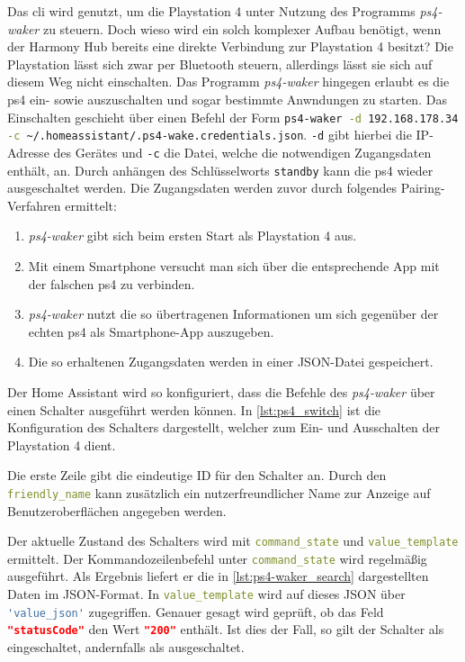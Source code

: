 Das \ac{cli} wird genutzt, um die Playstation 4 unter Nutzung des Programms \textit{ps4-waker}\cite{dhleongp12:online} zu steuern.
Doch wieso wird ein solch komplexer Aufbau benötigt, wenn der Harmony Hub bereits eine direkte Verbindung zur Playstation 4 besitzt?
Die Playstation lässt sich zwar per Bluetooth steuern, allerdings lässt sie sich auf diesem Weg nicht einschalten.
Das Programm \textit{ps4-waker} hingegen erlaubt es die \ac{ps4} ein- sowie auszuschalten und sogar bestimmte Anwndungen zu starten.
Das Einschalten geschieht über einen Befehl der Form \lstinline[language=bash]{ps4-waker -d 192.168.178.34  -c ~/.homeassistant/.ps4-wake.credentials.json}.
\lstinline[language=bash]{-d} gibt hierbei die IP-Adresse des Gerätes und
\lstinline[language=bash]{-c} die Datei,
welche die notwendigen Zugangsdaten enthält, an.
Durch anhängen des Schlüsselworts \lstinline[language=bash]{standby} kann die
\ac{ps4} wieder ausgeschaltet werden.
Die Zugangsdaten werden zuvor durch folgendes Pairing-Verfahren ermittelt:
\begin{enumerate}
    \setlength\itemsep{-0.5em}
    \item \textit{ps4-waker} gibt sich beim ersten Start als Playstation 4 aus.
    \item Mit einem Smartphone versucht man sich über die entsprechende App mit der falschen \ac{ps4} zu verbinden.
    \item \textit{ps4-waker} nutzt die so übertragenen Informationen um sich gegenüber der echten \ac{ps4} als Smartphone-App auszugeben.
    \item Die so erhaltenen Zugangsdaten werden in einer JSON-Datei gespeichert.
\end{enumerate}



Der Home Assistant wird so konfiguriert,
dass die Befehle des \textit{ps4-waker} über einen Schalter ausgeführt werden können.
In \autoref{lst:ps4_switch} ist die Konfiguration des Schalters dargestellt,
welcher zum Ein- und Ausschalten der Playstation 4 dient.



Die erste Zeile gibt die eindeutige ID für den Schalter an.
Durch den \lstinline[language=yaml]{friendly_name} kann zusätzlich ein nutzerfreundlicher Name zur Anzeige auf Benutzeroberflächen angegeben werden.

Der aktuelle Zustand des Schalters wird mit \lstinline[language=yaml]{command_state} und
\lstinline[language=yaml]{value_template} ermittelt.
Der Kommandozeilenbefehl unter \lstinline[language=yaml]{command_state} wird regelmäßig ausgeführt.
Als Ergebnis liefert er die in \autoref{lst:ps4-waker_search} dargestellten Daten im JSON-Format.
In \lstinline[language=yaml]{value_template} wird auf dieses JSON über
\lstinline[language=yaml]{'value_json'} zugegriffen.
Genauer gesagt wird geprüft,
ob das Feld \lstinline[language=json]{"statusCode"} den Wert
\lstinline[language=json]{"200"} enthält.
Ist dies der Fall, so gilt der Schalter als eingeschaltet, andernfalls als ausgeschaltet.

